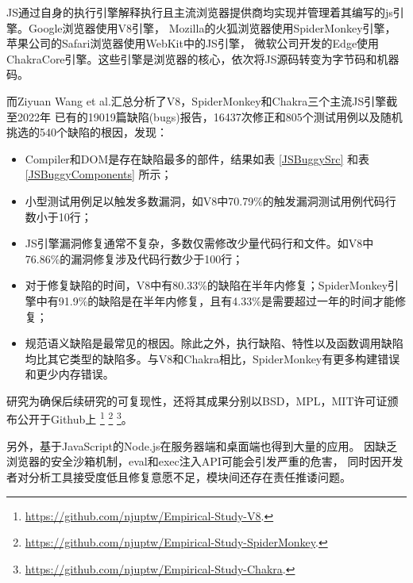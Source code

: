 		JS通过自身的执行引擎解释执行且主流浏览器提供商均实现并管理着其编写的js引擎。Google浏览器使用V8引擎\cite{v8Engine}，
		Mozilla的火狐浏览器使用SpiderMonkey引擎\cite{MozillaSpiderMonkey}，苹果公司的Safari浏览器使用WebKit\cite{WebKit}中的JS引擎，
		微软公司开发的Edge使用ChakraCore引擎\cite{ChakraCore}。这些引擎是浏览器的核心\cite{limSOKAnalysisWeb2021}，依次将JS源码转变为字节码和机器码。

		而Ziyuan Wang et al.\cite{JSEngineBugs}汇总分析了V8，SpiderMonkey和Chakra三个主流JS引擎截至2022年
		已有的19019篇缺陷(bugs)报告，16437次修正和805个测试用例以及随机挑选的540个缺陷的根因，发现：
		\begin{itemize}
			\item[(1)] Compiler和DOM是存在缺陷最多的部件，结果如表 \ref{JSBuggySrc} 和表 \ref{JSBuggyComponents} 所示；
			\item[(2)] 小型测试用例足以触发多数漏洞，如V8中70.79\%的触发漏洞测试用例代码行数小于10行；
			\item[(3)] JS引擎漏洞修复通常不复杂，多数仅需修改少量代码行和文件。如V8中76.86\%的漏洞修复涉及代码行数少于100行；
			\item[(4)] 对于修复缺陷的时间，V8中有80.33\%的缺陷在半年内修复；SpiderMonkey引擎中有91.9\%的缺陷是在半年内修复，且有4.33\%是需要超过一年的时间才能修复；
			\item[(5)] 规范语义缺陷是最常见的根因。除此之外，执行缺陷、特性以及函数调用缺陷均比其它类型的缺陷多。与V8和Chakra相比，SpiderMonkey有更多构建错误和更少内存错误。
		\end{itemize}

		研究为确保后续研究的可复现性，还将其成果分别以BSD，MPL，MIT许可证颁布公开于Github上
		\footnote{\url{https://github.com/njuptw/Empirical-Study-V8}.}
		\footnote{\url{https://github.com/njuptw/Empirical-Study-SpiderMonkey}.}
		\footnote{\url{https://github.com/njuptw/Empirical-Study-Chakra}.}。

		另外，基于JavaScript的Node.js在服务器端和桌面端也得到大量的应用\cite{nodejsAbuse}。
		因缺乏浏览器的安全沙箱机制，eval和exec注入API可能会引发严重的危害\cite{holtskogSecurityNodejsTheory2023}，
		同时因开发者对分析工具接受度低且修复意愿不足，模块间还存在责任推诿问题\cite{Staicu2018SYNODEUA}。

